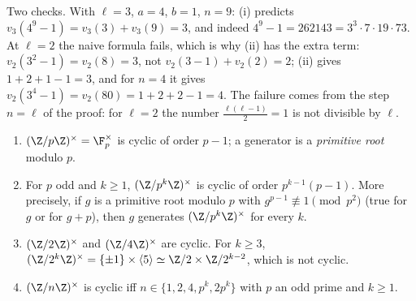 Two checks. With $\ell=3$, $a=4$, $b=1$, $n=9$: (i) predicts $v_3(4^9-1)=v_3(3)+v_3(9)=3$, and indeed $4^9-1=262143=3^3\cdot7\cdot19\cdot73$. At $\ell=2$ the
naive formula fails, which is why (ii) has the extra term: $v_2(3^2-1)=v_2(8)=3$, not $v_2(3-1)+v_2(2)=2$; (ii) gives $1+2+1-1=3$, and for $n=4$ it gives
$v_2(3^4-1)=v_2(80)=1+2+2-1=4$. The failure comes from the step $n=\ell$ of the proof: for $\ell=2$ the number $\frac{\ell(\ell-1)}2=1$ is not divisible by $\ell$.

\begin{theorem}\label{thm:rings:primitive-roots}
\begin{enumerate}[label=(\roman*)]
\item $(\Z/p\Z)^\times=\F_p^\times$ is cyclic of order $p-1$; a generator is a \emph{primitive root} modulo $p$.
\item For $p$ odd and $k\ge1$, $(\Z/p^k\Z)^\times$ is cyclic of order $p^{k-1}(p-1)$. More precisely, if $g$ is a primitive root modulo $p$ with
$g^{p-1}\not\equiv1\pmod{p^2}$ (true for $g$ or for $g+p$), then $g$ generates $(\Z/p^k\Z)^\times$ for every $k$.
\item $(\Z/2\Z)^\times$ and $(\Z/4\Z)^\times$ are cyclic. For $k\ge3$, $(\Z/2^k\Z)^\times=\{\pm1\}\times\langle5\rangle\simeq\Z/2\times\Z/2^{k-2}$, which is not cyclic.
\item $(\Z/n\Z)^\times$ is cyclic iff $n\in\{1,2,4,p^k,2p^k\}$ with $p$ an odd prime and $k\ge1$.
\end{enumerate}
\end{theorem}

